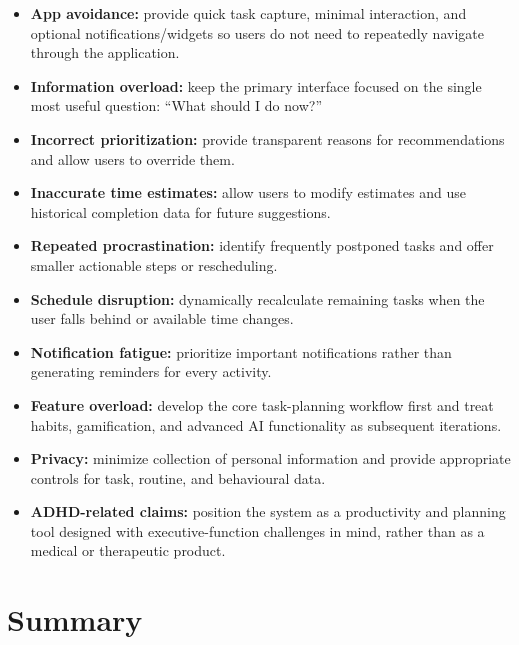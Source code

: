 \documentclass[11pt,a4paper]{article}
\begin{document}
\begin{itemize}[leftmargin=0.7cm]
    \item \textbf{App avoidance:} provide quick task capture, minimal interaction,
    and optional notifications/widgets so users do not need to repeatedly
    navigate through the application.
    
    \item \textbf{Information overload:} keep the primary interface focused on
    the single most useful question: ``What should I do now?''
    
    \item \textbf{Incorrect prioritization:} provide transparent reasons for
    recommendations and allow users to override them.
    
    \item \textbf{Inaccurate time estimates:} allow users to modify estimates
    and use historical completion data for future suggestions.
    
    \item \textbf{Repeated procrastination:} identify frequently postponed
    tasks and offer smaller actionable steps or rescheduling.
    
    \item \textbf{Schedule disruption:} dynamically recalculate remaining
    tasks when the user falls behind or available time changes.
    
    \item \textbf{Notification fatigue:} prioritize important notifications
    rather than generating reminders for every activity.
    
    \item \textbf{Feature overload:} develop the core task-planning workflow
    first and treat habits, gamification, and advanced AI functionality as
    subsequent iterations.
    
    \item \textbf{Privacy:} minimize collection of personal information and
    provide appropriate controls for task, routine, and behavioural data.
    
    \item \textbf{ADHD-related claims:} position the system as a productivity
    and planning tool designed with executive-function challenges in mind,
    rather than as a medical or therapeutic product.
\end{itemize}

\section{Summary}
\end{document}
